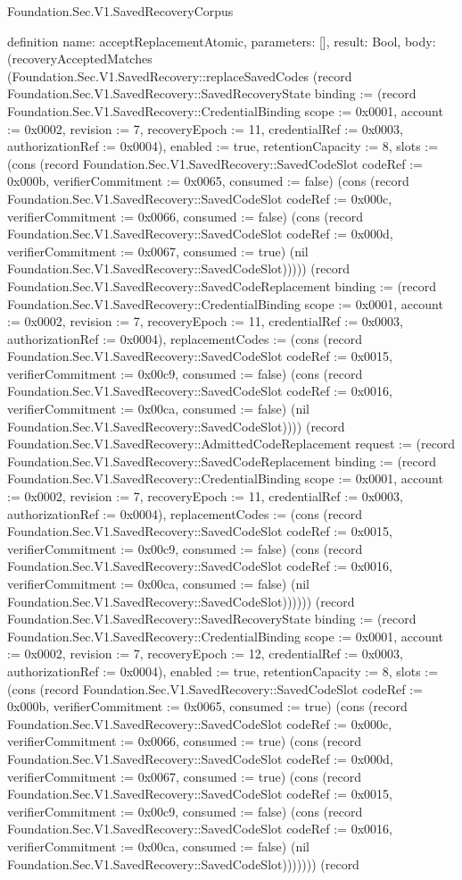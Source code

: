 \begin{lexlean}{Foundation.Sec.V1.SavedRecoveryCorpus}
\begin{semanticmodule}
definition{
  name: acceptReplacementAtomic,
  parameters: [],
  result: Bool,
  body: (recoveryAcceptedMatches (Foundation.Sec.V1.SavedRecovery::replaceSavedCodes (record Foundation.Sec.V1.SavedRecovery::SavedRecoveryState {binding := (record Foundation.Sec.V1.SavedRecovery::CredentialBinding {scope := 0x0001, account := 0x0002, revision := 7, recoveryEpoch := 11, credentialRef := 0x0003, authorizationRef := 0x0004}), enabled := true, retentionCapacity := 8, slots := (cons (record Foundation.Sec.V1.SavedRecovery::SavedCodeSlot {codeRef := 0x000b, verifierCommitment := 0x0065, consumed := false}) (cons (record Foundation.Sec.V1.SavedRecovery::SavedCodeSlot {codeRef := 0x000c, verifierCommitment := 0x0066, consumed := false}) (cons (record Foundation.Sec.V1.SavedRecovery::SavedCodeSlot {codeRef := 0x000d, verifierCommitment := 0x0067, consumed := true}) (nil Foundation.Sec.V1.SavedRecovery::SavedCodeSlot))))}) (record Foundation.Sec.V1.SavedRecovery::SavedCodeReplacement {binding := (record Foundation.Sec.V1.SavedRecovery::CredentialBinding {scope := 0x0001, account := 0x0002, revision := 7, recoveryEpoch := 11, credentialRef := 0x0003, authorizationRef := 0x0004}), replacementCodes := (cons (record Foundation.Sec.V1.SavedRecovery::SavedCodeSlot {codeRef := 0x0015, verifierCommitment := 0x00c9, consumed := false}) (cons (record Foundation.Sec.V1.SavedRecovery::SavedCodeSlot {codeRef := 0x0016, verifierCommitment := 0x00ca, consumed := false}) (nil Foundation.Sec.V1.SavedRecovery::SavedCodeSlot)))}) (record Foundation.Sec.V1.SavedRecovery::AdmittedCodeReplacement {request := (record Foundation.Sec.V1.SavedRecovery::SavedCodeReplacement {binding := (record Foundation.Sec.V1.SavedRecovery::CredentialBinding {scope := 0x0001, account := 0x0002, revision := 7, recoveryEpoch := 11, credentialRef := 0x0003, authorizationRef := 0x0004}), replacementCodes := (cons (record Foundation.Sec.V1.SavedRecovery::SavedCodeSlot {codeRef := 0x0015, verifierCommitment := 0x00c9, consumed := false}) (cons (record Foundation.Sec.V1.SavedRecovery::SavedCodeSlot {codeRef := 0x0016, verifierCommitment := 0x00ca, consumed := false}) (nil Foundation.Sec.V1.SavedRecovery::SavedCodeSlot)))})})) (record Foundation.Sec.V1.SavedRecovery::SavedRecoveryState {binding := (record Foundation.Sec.V1.SavedRecovery::CredentialBinding {scope := 0x0001, account := 0x0002, revision := 7, recoveryEpoch := 12, credentialRef := 0x0003, authorizationRef := 0x0004}), enabled := true, retentionCapacity := 8, slots := (cons (record Foundation.Sec.V1.SavedRecovery::SavedCodeSlot {codeRef := 0x000b, verifierCommitment := 0x0065, consumed := true}) (cons (record Foundation.Sec.V1.SavedRecovery::SavedCodeSlot {codeRef := 0x000c, verifierCommitment := 0x0066, consumed := true}) (cons (record Foundation.Sec.V1.SavedRecovery::SavedCodeSlot {codeRef := 0x000d, verifierCommitment := 0x0067, consumed := true}) (cons (record Foundation.Sec.V1.SavedRecovery::SavedCodeSlot {codeRef := 0x0015, verifierCommitment := 0x00c9, consumed := false}) (cons (record Foundation.Sec.V1.SavedRecovery::SavedCodeSlot {codeRef := 0x0016, verifierCommitment := 0x00ca, consumed := false}) (nil Foundation.Sec.V1.SavedRecovery::SavedCodeSlot))))))}) (record }
\end{semanticmodule}
\end{lexlean}
